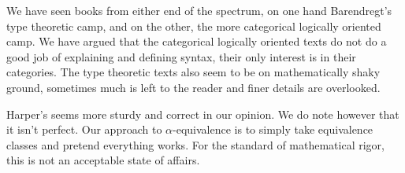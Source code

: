We have seen books from either end of the spectrum, on one hand Barendregt's type theoretic camp, and on the other, the more categorical logically oriented camp. We have argued that the categorical logically oriented texts do not do a good job of explaining and defining syntax, their only interest is in their categories. The type theoretic texts also seem to be on mathematically shaky ground, sometimes much is left to the reader and finer details are overlooked.

Harper's seems more sturdy and correct in our opinion. We do note however that it isn't perfect. Our approach to $\alpha$-equivalence is to simply take equivalence classes and pretend everything works. For the standard of mathematical rigor, this is not an acceptable state of affairs.





